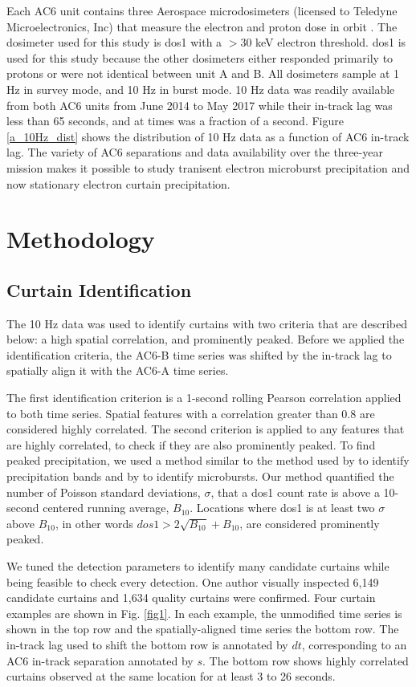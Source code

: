 \documentclass[draft]{agujournal2019}
\begin{document}
Each AC6 unit contains three Aerospace microdosimeters (licensed to Teledyne Microelectronics, Inc) that measure the electron and proton dose in orbit \cite{O'brien2016}. The dosimeter used for this study is dos1 with a $> 30$ keV electron threshold. dos1 is used for this study because the other dosimeters either responded primarily to protons or were not identical between unit A and B. All dosimeters sample at 1 Hz in survey mode, and 10 Hz in burst mode. 10 Hz data was readily available from both AC6 units from June 2014 to May 2017 while their in-track lag was less than 65 seconds, and at times was a fraction of a second. Figure \ref{a_10Hz_dist} shows the distribution of 10 Hz data as a function of AC6 in-track lag. The variety of AC6 separations and data availability over the three-year mission makes it possible to study tranisent electron microburst precipitation \cite{Shumko2020} and now stationary electron curtain precipitation.

\section{Methodology} 
\subsection{Curtain Identification} \label{curtain_identification}
The 10 Hz data was used to identify curtains with two criteria that are described below: a high spatial correlation, and prominently peaked. Before we applied the identification criteria, the AC6-B time series was shifted by the in-track lag to spatially align it with the AC6-A time series. 

The first identification criterion is a 1-second rolling Pearson correlation applied to both time series. Spatial features with a correlation greater than 0.8 are considered highly correlated. The second criterion is applied to any features that are highly correlated, to check if they are also prominently peaked. To find peaked precipitation, we used a method similar to the method used by  to identify precipitation bands and by  to identify microbursts. Our method quantified the number of Poisson standard deviations, $\sigma$, that a dos1 count rate is above a 10-second centered running average, $B_{10}$. Locations where dos1 is at least two $\sigma$ above $B_{10}$, in other words $dos1 > 2\sqrt{B_{10}} + B_{10}$, are considered prominently peaked. 

We tuned the detection parameters to identify many candidate curtains while being feasible to check every detection. One author visually inspected 6,149 candidate curtains and 1,634 quality curtains were confirmed. Four curtain examples are shown in Fig. \ref{fig1}. In each example, the unmodified time series is shown in the top row and the spatially-aligned time series the bottom row. The in-track lag used to shift the bottom row is annotated by $dt$, corresponding to an AC6 in-track separation annotated by $s$. The bottom row shows highly correlated curtains observed at the same location for at least 3 to 26 seconds.
\end{document}
